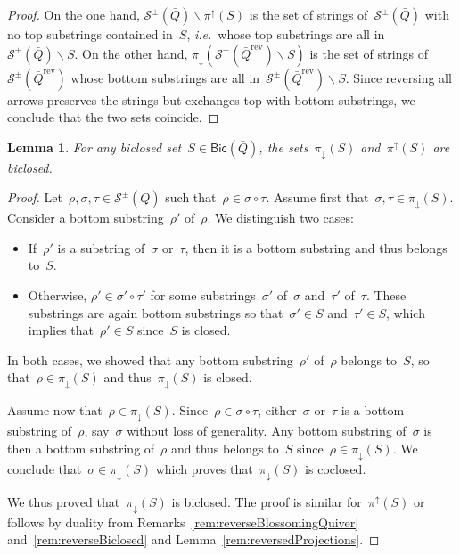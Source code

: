 \documentclass{amsart}
\newtheorem{lemma}[theorem]{Lemma}
\theoremstyle{definition}
\newcommand{\ssm}{\smallsetminus} %
\newcommand{\ie}{\textit{i.e.}~} %
\newcommand{\strings}{\mathcal{S}} %
\newcommand{\reversed}[1]{#1^{\mathrm{rev}}} %
\newcommand{\Bicl}[1]{\mathsf{Bic}(#1)} %
\newcommand{\projDown}{\pi_\downarrow} %
\newcommand{\projUp}{\pi^\uparrow} %
\begin{document}
\begin{proof}
On the one hand, $\strings^\pm(\bar Q) \ssm \projUp(S)$ is the set of strings of~$\strings^\pm(\bar Q)$ with no top substrings contained in~$S$, \ie whose top substrings are all in~$\strings^\pm(\bar Q) \ssm S$.
On the other hand, ${\projDown(\strings^\pm(\reversed{\bar Q}) \ssm S)}$ is the set of strings of~$\strings^\pm(\reversed{\bar Q})$ whose bottom substrings are all in~$\strings^\pm(\reversed{\bar Q}) \ssm S$.
Since reversing all arrows preserves the strings but exchanges top with bottom substrings, we conclude that the two sets coincide. 
\end{proof}

\begin{lemma}
For any biclosed set~$S \in \Bicl{\bar Q}$, the sets~$\projDown(S)$ and~$\projUp(S)$ are biclosed.
\end{lemma}

\begin{proof}
Let~$\rho, \sigma, \tau \in \strings^\pm(\bar Q)$ such that~$\rho \in \sigma \circ \tau$.
Assume first that~$\sigma, \tau \in \projDown(S)$.
Consider a bottom substring~$\rho'$ of~$\rho$.
We distinguish two cases:
\begin{itemize}
\item If~$\rho'$ is a substring of~$\sigma$ or~$\tau$, then it is a bottom substring and thus belongs to~$S$.
\item Otherwise, $\rho' \in \sigma' \circ \tau'$ for some substrings~$\sigma'$ of~$\sigma$ and~$\tau'$ of~$\tau$. These substrings are again bottom substrings so that~$\sigma' \in S$ and~$\tau' \in S$, which implies that~$\rho' \in S$ since~$S$ is closed.
\end{itemize}
In both cases, we showed that any bottom substring~$\rho'$ of~$\rho$ belongs to~$S$, so that~$\rho \in \projDown(S)$ and thus~$\projDown(S)$ is closed.

Assume now that~$\rho \in \projDown(S)$.
Since~$\rho \in \sigma \circ \tau$, either~$\sigma$ or~$\tau$ is a bottom substring of~$\rho$, say~$\sigma$ without loss of generality.
Any bottom substring of~$\sigma$ is then a bottom substring of~$\rho$ and thus belongs to~$S$ since~$\rho \in \projDown(S)$.
We conclude that~$\sigma \in \projDown(S)$ which proves that~$\projDown(S)$ is coclosed.

We thus proved that~$\projDown(S)$ is biclosed.
The proof is similar for~$\projUp(S)$ or follows by duality from Remarks~\ref{rem:reverseBlossomingQuiver} and~\ref{rem:reverseBiclosed} and Lemma~\ref{rem:reversedProjections}.
\end{proof}
\end{document}
